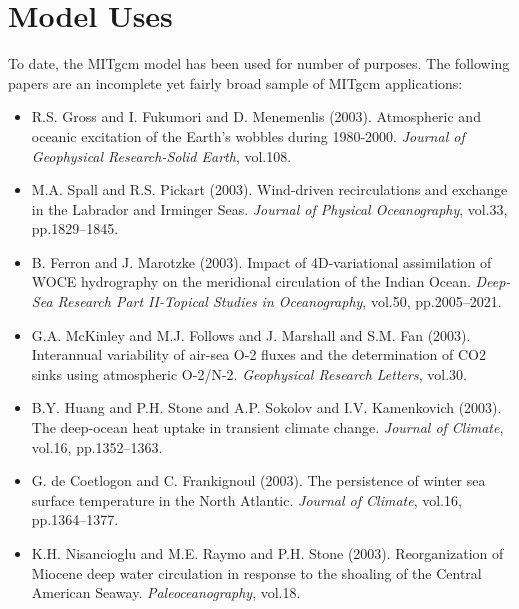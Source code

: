 
\chapter{Model Uses}

To date, the MITgcm model has been used for number of purposes.  The
following papers are an incomplete yet fairly broad sample of MITgcm
applications:

\begin{itemize}

\item R.S. Gross and I. Fukumori and D. Menemenlis (2003).
Atmospheric and oceanic excitation of the Earth's wobbles during 1980-2000.
{\it Journal of Geophysical Research-Solid Earth}, vol.108.

\item M.A. Spall and R.S. Pickart (2003).
Wind-driven recirculations and exchange in the Labrador and Irminger Seas. 
{\it Journal of Physical Oceanography}, vol.33, pp.1829--1845. 

\item B. Ferron and J. Marotzke (2003).
Impact of 4D-variational assimilation of WOCE hydrography on the
meridional circulation of the Indian Ocean. {\it Deep-Sea Research Part
II-Topical Studies in Oceanography}, vol.50, pp.2005--2021.

\item G.A. McKinley and M.J. Follows and J. Marshall and S.M. Fan (2003).
Interannual variability of air-sea O-2 fluxes and the determination of
CO2 sinks using atmospheric O-2/N-2. {\it Geophysical Research Letters},
vol.30. 

\item B.Y. Huang and P.H. Stone and A.P. Sokolov and I.V. Kamenkovich
(2003). The deep-ocean heat uptake in transient climate change. {\it Journal
of Climate}, vol.16, pp.1352--1363. 

\item G. de Coetlogon and C. Frankignoul (2003). The persistence of winter
sea surface temperature in the North Atlantic. {\it Journal of Climate},
vol.16, pp.1364--1377. 

\item K.H. Nisancioglu and M.E. Raymo and P.H. Stone (2003).
Reorganization of Miocene deep water circulation in response to the
shoaling of the Central American Seaway. {\it Paleoceanography}, vol.18. 


\end{itemize}

